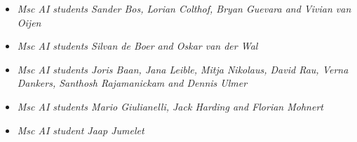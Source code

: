 {{{{{{{{{
{\begin{itemize}
  \item[] \textit{Msc AI students Sander Bos, Lorian Colthof, Bryan Guevara and Vivian van Oijen}
\end{itemize}}}

{
{\begin{itemize}
  \item[] \textit{Msc AI students Silvan de Boer and Oskar van der Wal}
\end{itemize}}}

{
{\begin{itemize}
  \item[] \textit{Msc AI students Joris Baan, Jana Leible, Mitja Nikolaus, David Rau, Verna Dankers, Santhosh Rajamanickam and Dennis Ulmer}
\end{itemize}}}

{
{\begin{itemize}
  \item[] \textit{Msc AI students Mario Giulianelli, Jack Harding and Florian Mohnert}
\end{itemize}}}

{
{\begin{itemize}
  \item[] \textit{Msc AI student Jaap Jumelet}
\end{itemize}}}


}}}}}}}}

